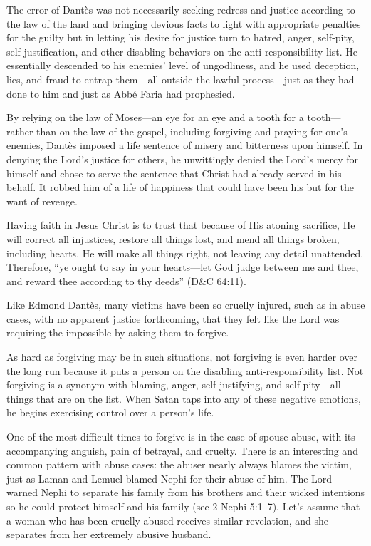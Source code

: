 \documentclass[letterpaper, 11pt]{report}
\begin{document}
The error of Dantès was not necessarily seeking redress and justice according to the law of the land and bringing devious facts to light with appropriate penalties for the guilty but in letting his desire for justice turn to hatred, anger, self-pity, self-justification, and other disabling behaviors on the anti-responsibility list. He essentially descended to his enemies’ level of ungodliness, and he used deception, lies, and fraud to entrap them—all outside the lawful process—just as they had done to him and just as Abbé Faria had prophesied.

By relying on the law of Moses—an eye for an eye and a tooth for a tooth—rather than on the law of the gospel, including forgiving and praying for one’s enemies, Dantès imposed a life sentence of misery and bitterness upon himself. In denying the Lord’s justice for others, he unwittingly denied the Lord’s mercy for himself and chose to serve the sentence that Christ had already served in his behalf. It robbed him of a life of happiness that could have been his but for the want of revenge.

Having faith in Jesus Christ is to trust that because of His atoning sacrifice, He will correct all injustices, restore all things lost, and mend all things broken, including hearts. He will make all things right, not leaving any detail unattended. Therefore, “ye ought to say in your hearts—let God judge between me and thee, and reward thee according to thy deeds” (D\&C 64:11).

Like Edmond Dantès, many victims have been so cruelly injured, such as in abuse cases, with no apparent justice forthcoming, that they felt like the Lord was requiring the impossible by asking them to forgive.

As hard as forgiving may be in such situations, not forgiving is even harder over the long run because it puts a person on the disabling anti-responsibility list. Not forgiving is a synonym with blaming, anger, self-justifying, and self‑pity—all things that are on the list. When Satan taps into any of these negative emotions, he begins exercising control over a person’s life.

One of the most difficult times to forgive is in the case of spouse abuse, with its accompanying anguish, pain of betrayal, and cruelty. There is an interesting and common pattern with abuse cases: the abuser nearly always blames the victim, just as Laman and Lemuel blamed Nephi for their abuse of him. The Lord warned Nephi to separate his family from his brothers and their wicked intentions so he could protect himself and his family (see 2 Nephi 5:1–7). Let’s assume that a woman who has been cruelly abused receives similar revelation, and she separates from her extremely abusive husband.
\end{document}
